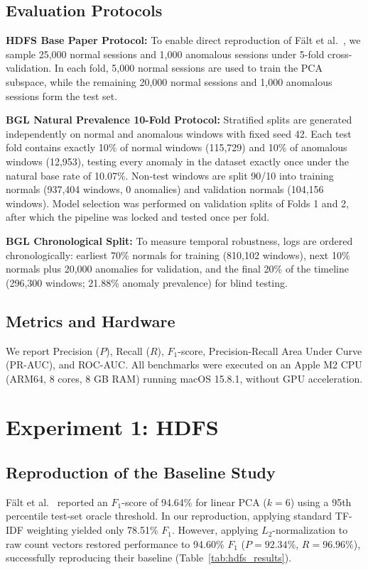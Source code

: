 \documentclass[conference]{IEEEtran}
\begin{document}
\subsection{Evaluation Protocols}
\textbf{HDFS Base Paper Protocol:} To enable direct reproduction of F{\"a}lt et al.~\cite{falt2025lightweight}, we sample 25,000 normal sessions and 1,000 anomalous sessions under 5-fold cross-validation. In each fold, 5,000 normal sessions are used to train the PCA subspace, while the remaining 20,000 normal sessions and 1,000 anomalous sessions form the test set.

\textbf{BGL Natural Prevalence 10-Fold Protocol:} Stratified splits are generated independently on normal and anomalous windows with fixed seed 42. Each test fold contains exactly 10\% of normal windows (115,729) and 10\% of anomalous windows (12,953), testing every anomaly in the dataset exactly once under the natural base rate of 10.07\%. Non-test windows are split 90/10 into training normals (937,404 windows, 0 anomalies) and validation normals (104,156 windows). Model selection was performed on validation splits of Folds 1 and 2, after which the pipeline was locked and tested once per fold.

\textbf{BGL Chronological Split:} To measure temporal robustness, logs are ordered chronologically: earliest 70\% normals for training (810,102 windows), next 10\% normals plus 20,000 anomalies for validation, and the final 20\% of the timeline (296,300 windows; 21.88\% anomaly prevalence) for blind testing.

\subsection{Metrics and Hardware}
We report Precision ($P$), Recall ($R$), $F_1$-score, Precision-Recall Area Under Curve (PR-AUC), and ROC-AUC. All benchmarks were executed on an Apple M2 CPU (ARM64, 8 cores, 8 GB RAM) running macOS 15.8.1, without GPU acceleration.

\section{Experiment 1: HDFS}
\label{sec:hdfs}

\subsection{Reproduction of the Baseline Study}
F{\"a}lt et al.~\cite{falt2025lightweight} reported an $F_1$-score of 94.64\% for linear PCA ($k=6$) using a 95th percentile test-set oracle threshold. In our reproduction, applying standard TF-IDF weighting yielded only 78.51\% $F_1$. However, applying $L_2$-normalization to raw count vectors restored performance to 94.60\% $F_1$ ($P=92.34\%$, $R=96.96\%$), successfully reproducing their baseline (Table~\ref{tab:hdfs_results}).
\end{document}
